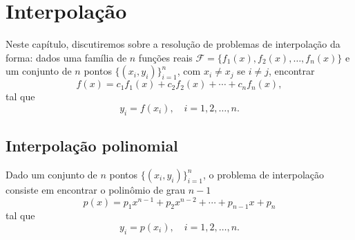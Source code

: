 
\chapter{Interpolação}\label{cap_interp}
\thispagestyle{fancy}

Neste capítulo, discutiremos sobre a resolução de problemas de interpolação da forma: dados uma família de $n$ funções reais $\mathcal{F} = \{f_1(x), f_2(x), \ldots, f_n(x)\}$ e um conjunto de $n$ pontos $\{(x_i, y_i)\}_{i=1}^n$, com $x_i\neq x_j$ se $i\neq j$, encontrar
\begin{equation}
  f(x) = c_1f_1(x) + c_2f_2(x) + \cdots + c_nf_n(x),
\end{equation}
tal que
\begin{equation}
  y_i = f(x_i),\quad i=1, 2, \ldots, n.
\end{equation}

\section{Interpolação polinomial}\label{cap_interp_sec_interpoli}

Dado um conjunto de $n$ pontos $\{(x_i, y_i)\}_{i=1}^n$, o problema de interpolação consiste em encontrar o polinômio de grau $n-1$
\begin{equation}\label{eq:interpoli_poli}
  p(x) = p_1x^{n-1} + p_2x^{n-2} + \cdots + p_{n-1}x + p_n
\end{equation}
tal que
\begin{equation}\label{eq:interpoli_conds}
  y_i = p(x_i),\quad i=1, 2, \ldots, n.
\end{equation}

